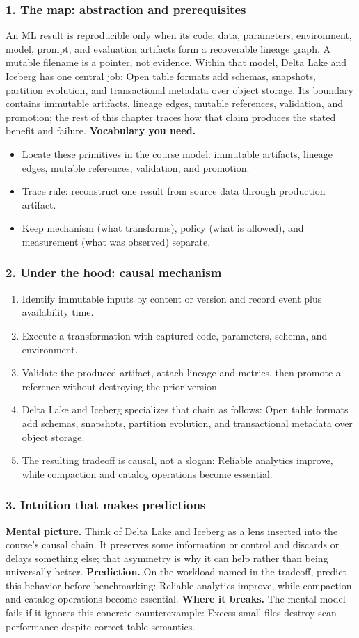 \subsubsection*{1. The map: abstraction and prerequisites}
An ML result is reproducible only when its code, data, parameters, environment, model, prompt, and evaluation artifacts form a recoverable lineage graph. A mutable filename is a pointer, not evidence.
Within that model, Delta Lake and Iceberg has one central job: Open table formats add schemas, snapshots, partition evolution, and transactional metadata over object storage. Its boundary contains immutable artifacts, lineage edges, mutable references, validation, and promotion; the rest of this chapter traces how that claim produces the stated benefit and failure.
\textbf{Vocabulary you need.}\begin{itemize}
\item Locate these primitives in the course model: immutable artifacts, lineage edges, mutable references, validation, and promotion.
\item Trace rule: reconstruct one result from source data through production artifact.
\item Keep mechanism (what transforms), policy (what is allowed), and measurement (what was observed) separate.
\end{itemize}
\subsubsection*{2. Under the hood: causal mechanism}\begin{enumerate}
\item Identify immutable inputs by content or version and record event plus availability time.
\item Execute a transformation with captured code, parameters, schema, and environment.
\item Validate the produced artifact, attach lineage and metrics, then promote a reference without destroying the prior version.
\item Delta Lake and Iceberg specializes that chain as follows: Open table formats add schemas, snapshots, partition evolution, and transactional metadata over object storage.
\item The resulting tradeoff is causal, not a slogan: Reliable analytics improve, while compaction and catalog operations become essential.
\end{enumerate}
\subsubsection*{3. Intuition that makes predictions}
\textbf{Mental picture.} Think of Delta Lake and Iceberg as a lens inserted into the course's causal chain. It preserves some information or control and discards or delays something else; that asymmetry is why it can help rather than being universally better.
\textbf{Prediction.} On the workload named in the tradeoff, predict this behavior before benchmarking: Reliable analytics improve, while compaction and catalog operations become essential.
\textbf{Where it breaks.} The mental model fails if it ignores this concrete counterexample: Excess small files destroy scan performance despite correct table semantics.
